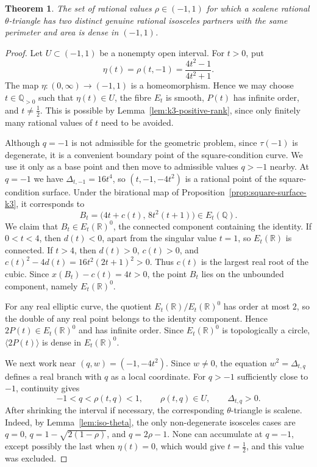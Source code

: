 \documentclass[11pt]{amsart}
\theoremstyle{plain}
\newtheorem{thm}{Theorem}[section]
\theoremstyle{remark}
\theoremstyle{plain}
\newcommand{\Q}{\mathbb{Q}}
\newcommand{\R}{\mathbb{R}}
\begin{document}
\begin{thm}\label{thm:infinitely-many-two-partners}
The set of rational values $\rho\in(-1,1)$ for which a scalene
rational $\theta$-triangle has two distinct genuine rational isosceles
partners with the same perimeter and area is dense in $(-1,1)$.
\end{thm}

\begin{proof}
Let $U\subset(-1,1)$ be a nonempty open interval. For $t>0$, put
\[
\eta(t)=\rho(t,-1)=\frac{4t^2-1}{4t^2+1}.
\]
The map $\eta:(0,\infty)\to(-1,1)$ is a homeomorphism. Hence we may
choose $t\in\Q_{>0}$ such that $\eta(t)\in U$, the fibre $E_t$ is
smooth, $P(t)$ has infinite order, and $t\ne\frac12$. This is possible
by Lemma~\ref{lem:k3-positive-rank}, since only finitely many rational
values of $t$ need to be avoided.

Although $q=-1$ is not admissible for the geometric problem, since
$\tau(-1)$ is degenerate, it is a convenient boundary point of the
square-condition curve. We use it only as a base point and then move
to admissible values $q>-1$ nearby.
At $q=-1$ we have $\Delta_{t,-1}=16t^4$, so
$(t,-1,-4t^2)$ is a rational point of the square-condition surface.
Under the birational map of Proposition~\ref{prop:square-surface-k3},
it corresponds to
\[
B_t=\bigl(4t+c(t),\,8t^2(t+1)\bigr)\in E_t(\Q).
\]
We claim that $B_t\in E_t(\R)^0$, the connected component containing the identity. If $0<t<4$, then $d(t)<0$, apart
from the singular value $t=1$, so $E_t(\R)$ is connected. If $t>4$,
then $d(t)>0$, $c(t)>0$, and
$c(t)^2-4d(t)=16t^2(2t+1)^2>0$. Thus $c(t)$ is the largest real root
of the cubic. Since $x(B_t)-c(t)=4t>0$, the point $B_t$ lies on the
unbounded component, namely $E_t(\R)^0$.

For any real elliptic curve, the quotient
$E_t(\R)/E_t(\R)^0$ has order at most $2$, so the double of any real point
belongs to the identity component. Hence $2P(t)\in E_t(\R)^0$ and has
infinite order. Since $E_t(\R)^0$ is topologically a circle,
$\langle 2P(t)\rangle$ is dense in $E_t(\R)^0$.


We next work near $(q,w)=(-1,-4t^2)$. Since $w\ne0$, the equation
$w^2=\Delta_{t,q}$ defines a real branch with $q$ as a local
coordinate. For $q>-1$ sufficiently close to $-1$, continuity gives
\[
-1<q<\rho(t,q)<1,\qquad
\rho(t,q)\in U,\qquad
\Delta_{t,q}>0.
\]
After shrinking the interval if necessary, the corresponding
$\theta$-triangle is scalene. Indeed, by Lemma~\ref{lem:iso-theta},
the only non-degenerate isosceles cases are
$q=0$, $q=1-\sqrt{2(1-\rho)}$, and $q=2\rho-1$. None can accumulate
at $q=-1$, except possibly the last when $\eta(t)=0$, which would
give $t=\frac12$, and this value was excluded.


\end{proof}
\end{document}
